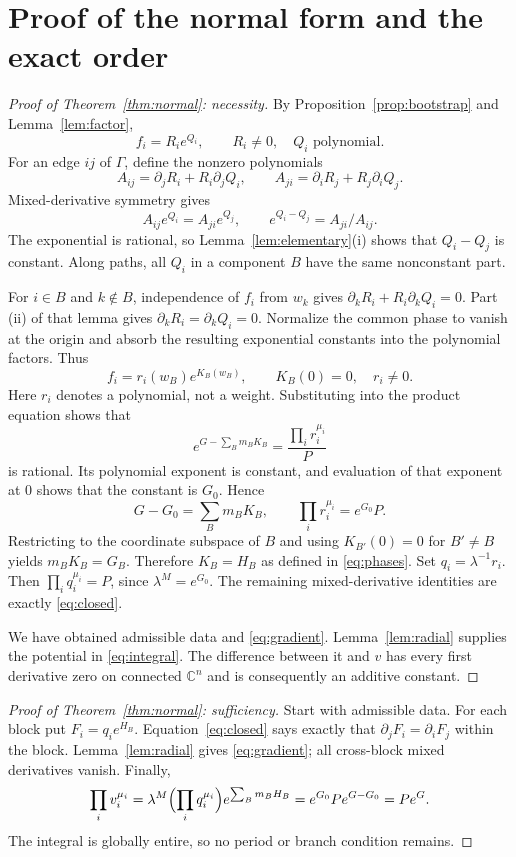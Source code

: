 \documentclass[11pt]{article}
\numberwithin{equation}{section}
\theoremstyle{definition}\newtheorem{definition}[theorem]{Definition}
\theoremstyle{remark}\newtheorem{remark}[theorem]{Remark}
\newcommand{\C}{\mathbb C}
\begin{document}
\section{Proof of the normal form and the exact order}
\begin{proof}[Proof of Theorem~\ref{thm:normal}: necessity]
By Proposition~\ref{prop:bootstrap} and Lemma~\ref{lem:factor},
\begin{equation}\label{eq:polylog}
 f_i=R_i e^{Q_i},\qquad R_i\ne0,\quad Q_i\text{ polynomial}.
\end{equation}
For an edge $ij$ of $\Gamma$, define the nonzero polynomials
\[
 A_{ij}=\partial_jR_i+R_i\partial_jQ_i,\qquad
 A_{ji}=\partial_iR_j+R_j\partial_iQ_j.
\]
Mixed-derivative symmetry gives
\[
 A_{ij}e^{Q_i}=A_{ji}e^{Q_j},\qquad
 e^{Q_i-Q_j}=A_{ji}/A_{ij}.
\]
The exponential is rational, so Lemma~\ref{lem:elementary}(i) shows that $Q_i-Q_j$ is constant. Along paths, all $Q_i$ in a component
$B$ have the same nonconstant part.

For $i\in B$ and $k\notin B$, independence of $f_i$ from $w_k$ gives
$\partial_kR_i+R_i\partial_kQ_i=0$. Part (ii) of that lemma gives
$\partial_kR_i=\partial_kQ_i=0$. Normalize the common phase to vanish
at the origin and absorb the resulting exponential constants into the
polynomial factors. Thus
\begin{equation}\label{eq:normalized-component}
 f_i=r_i(w_B)e^{K_B(w_B)},\qquad K_B(0)=0,\quad r_i\ne0.
\end{equation}
Here $r_i$ denotes a polynomial, not a weight. Substituting into the
product equation shows that
\[
 e^{G-\sum_Bm_BK_B}=\frac{\prod_i r_i^{\mu_i}}{P}
\]
is rational. Its polynomial exponent is constant, and evaluation of that
exponent at $0$ shows that the constant is $G_0$. Hence
\[
 G-G_0=\sum_Bm_BK_B,\qquad
 \prod_i r_i^{\mu_i}=e^{G_0}P.
\]
Restricting to the coordinate subspace of $B$ and using $K_{B'}(0)=0$
for $B'\ne B$ yields $m_BK_B=G_B$. Therefore $K_B=H_B$ as defined in
\eqref{eq:phases}. Set $q_i=\lambda^{-1}r_i$. Then
$\prod_iq_i^{\mu_i}=P$, since $\lambda^M=e^{G_0}$. The remaining
mixed-derivative identities are exactly \eqref{eq:closed}.

We have obtained admissible data and \eqref{eq:gradient}.
Lemma~\ref{lem:radial} supplies the potential in \eqref{eq:integral}.
The difference between it and $v$ has every first derivative zero on
connected $\C^n$ and is consequently an additive constant.
\end{proof}

\begin{proof}[Proof of Theorem~\ref{thm:normal}: sufficiency]
Start with admissible data. For each block put $F_i=q_i e^{H_B}$.
Equation~\eqref{eq:closed} says exactly that
$\partial_jF_i=\partial_iF_j$ within the block. Lemma~\ref{lem:radial}
gives \eqref{eq:gradient}; all cross-block mixed derivatives vanish.
Finally,
\[
 \prod_i v_i^{\mu_i}
 =\lambda^M\Bigl(\prod_iq_i^{\mu_i}\Bigr)
     e^{\sum_Bm_BH_B}
 =e^{G_0}P e^{G-G_0}=P e^G.
\]
The integral is globally entire, so no period or branch condition remains.
\end{proof}
\end{document}
